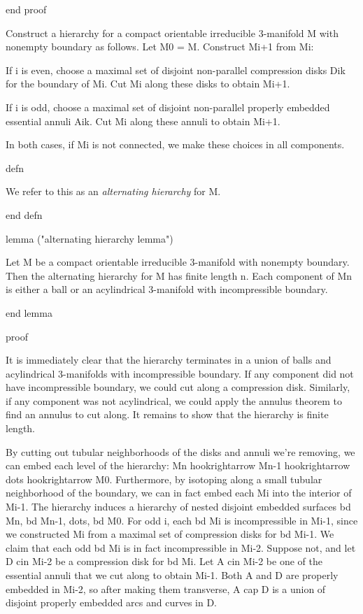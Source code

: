 end proof

Construct a hierarchy for a compact orientable irreducible 3-manifold M with
nonempty boundary as follows.  Let M0 = M.  Construct Mi+1 from Mi:

If i is even, choose a maximal set of disjoint non-parallel compression disks
Dik for the boundary of Mi. Cut Mi along these disks to obtain Mi+1.

If i is odd, choose a maximal set of disjoint non-parallel properly embedded
essential annuli Aik. Cut Mi along these annuli to obtain Mi+1.

In both cases, if Mi is not connected, we make these choices in all components.

defn

We refer to this as an \emph{alternating hierarchy} for M.

end defn

lemma ("alternating hierarchy lemma")

Let M be a compact orientable irreducible 3-manifold with nonempty boundary.
Then the alternating hierarchy for M has finite length n. Each component of Mn
is either a ball or an acylindrical 3-manifold with incompressible boundary.

end lemma

proof

It is immediately clear that the hierarchy terminates in a union of balls and
acylindrical 3-manifolds with incompressible boundary. If any component did not
have incompressible boundary, we could cut along a compression disk.
Similarly, if any component was not acylindrical, we could apply the annulus
theorem to find an annulus to cut along. It remains to show that the hierarchy
is finite length.

By cutting out tubular neighborhoods of the disks and annuli we're removing, we
can embed each level of the hierarchy: Mn hookrightarrow Mn-1 hookrightarrow
dots hookrightarrow M0. Furthermore, by isotoping along a small tubular
neighborhood of the boundary, we can in fact embed each Mi into the interior of
Mi-1. The hierarchy induces a hierarchy of nested disjoint embedded surfaces bd
Mn, bd Mn-1, dots, bd M0. For odd i, each bd Mi is incompressible in Mi-1,
since we constructed Mi from a maximal set of compression disks for bd Mi-1.
We claim that each odd bd Mi is in fact incompressible in Mi-2.  Suppose not,
and let D cin Mi-2 be a compression disk for bd Mi. Let A cin Mi-2 be one of
the essential annuli that we cut along to obtain Mi-1. Both A and D are
properly embedded in Mi-2, so after making them transverse, A cap D is a union
of disjoint properly embedded arcs and curves in D.

